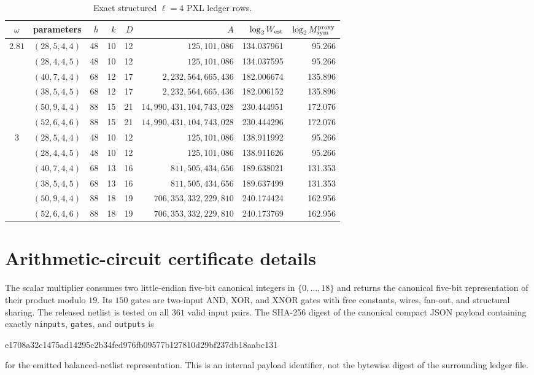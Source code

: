 \documentclass[11pt]{article}
\begin{document}
\begin{table}[H]
\centering
\caption{Exact structured $\ell=4$ PXL ledger rows.}
\label{tab:pxl-l4-structured-ledger}
\scriptsize
\setlength{\tabcolsep}{3pt}
\begin{tabular}{@{}c l r r r r r r@{}}
\toprule
$\omega$ & parameters & $h$ & $k$ & $D$ & $A$ & $\log_2 W_{\rm est}$ & $\log_2 M_{\rm sym}^{\rm proxy}$\\
\midrule
$2.81$ & $(28,5,4,4)$ & 48 & 10 & 12 & $125{,}101{,}086$ & 134.037961 & 95.266\\
       & $(28,4,4,5)$ & 48 & 10 & 12 & $125{,}101{,}086$ & 134.037595 & 95.266\\
       & $(40,7,4,4)$ & 68 & 12 & 17 & $2{,}232{,}564{,}665{,}436$ & 182.006674 & 135.896\\
       & $(38,5,4,5)$ & 68 & 12 & 17 & $2{,}232{,}564{,}665{,}436$ & 182.006152 & 135.896\\
       & $(50,9,4,4)$ & 88 & 15 & 21 & $14{,}990{,}431{,}104{,}743{,}028$ & 230.444951 & 172.076\\
       & $(52,6,4,6)$ & 88 & 15 & 21 & $14{,}990{,}431{,}104{,}743{,}028$ & 230.444296 & 172.076\\
\midrule
$3$    & $(28,5,4,4)$ & 48 & 10 & 12 & $125{,}101{,}086$ & 138.911992 & 95.266\\
       & $(28,4,4,5)$ & 48 & 10 & 12 & $125{,}101{,}086$ & 138.911626 & 95.266\\
       & $(40,7,4,4)$ & 68 & 13 & 16 & $811{,}505{,}434{,}656$ & 189.638021 & 131.353\\
       & $(38,5,4,5)$ & 68 & 13 & 16 & $811{,}505{,}434{,}656$ & 189.637499 & 131.353\\
       & $(50,9,4,4)$ & 88 & 18 & 19 & $706{,}353{,}332{,}229{,}810$ & 240.174424 & 162.956\\
       & $(52,6,4,6)$ & 88 & 18 & 19 & $706{,}353{,}332{,}229{,}810$ & 240.173769 & 162.956\\
\bottomrule
\end{tabular}
\end{table}

\section{Arithmetic-circuit certificate details}\label{app:circuits}
The scalar multiplier consumes two little-endian five-bit canonical integers
in $\{0,\ldots,18\}$ and returns the canonical five-bit representation of
their product modulo $19$.  Its $150$ gates are two-input AND, XOR, and XNOR
gates with free constants, wires, fan-out, and structural sharing.  The
released netlist is tested on all $361$ valid input pairs.  The SHA-256 digest
of the canonical compact JSON payload containing exactly
\texttt{ninputs}, \texttt{gates}, and \texttt{outputs} is
\begin{center}
\ttfamily\small
 e1708a32c1475ad14295c2b34fed976fb09577b127810d29bf237db18aabc131
\end{center}
for the emitted balanced-netlist representation.  This is an internal payload
identifier, not the bytewise digest of the surrounding ledger file.
\end{document}
